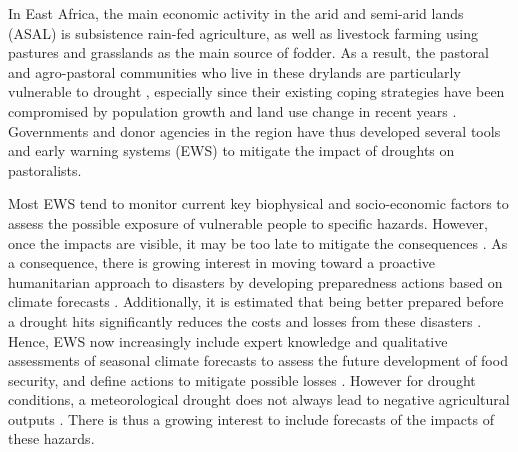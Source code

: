 \documentclass[review]{elsarticle}
\begin{document}
In East Africa, the main economic activity in the arid and semi-arid lands (ASAL) is subsistence rain-fed agriculture, as well as livestock farming using pastures and grasslands as the main source of fodder. As a result, the pastoral and agro-pastoral communities who live in these drylands are particularly vulnerable to drought 
\citep{Nyong2007,orindi2007pastoral}, especially since their existing coping strategies have been compromised by population growth and land use change in recent years \citep{Galvin2001ImpactsOC}. %
Governments and donor agencies in the region have thus developed several tools and early warning systems (EWS) to mitigate the impact of droughts on pastoralists.

Most EWS tend to monitor current key biophysical and socio-economic factors to assess the possible exposure of vulnerable people to specific hazards. However, once the impacts are visible, it may be too late to mitigate the consequences \citep{kogan}. As a consequence, there is growing interest in moving toward a proactive humanitarian approach to disasters by developing preparedness actions based on climate forecasts \citep{nhess-15-895-2015,lopez2018bridging, wilkinson2018forecasting}. Additionally, it is estimated that being better prepared before a drought hits significantly reduces the costs and losses from these disasters \citep{venton2012economics}. Hence, EWS now increasingly include expert knowledge and qualitative assessments of seasonal climate forecasts to assess the future development of food security, and define actions to mitigate possible losses \citep{nhess-15-895-2015,TozierdelaPoterie2015}. However for drought conditions, a meteorological drought does not always lead to negative agricultural outputs \citep{BHUIYAN2006289}. There is thus a growing interest to include forecasts of the impacts of these hazards\citep{wmo2015wmo,nhess-2018-26,Sutanto2019}.
\end{document}
